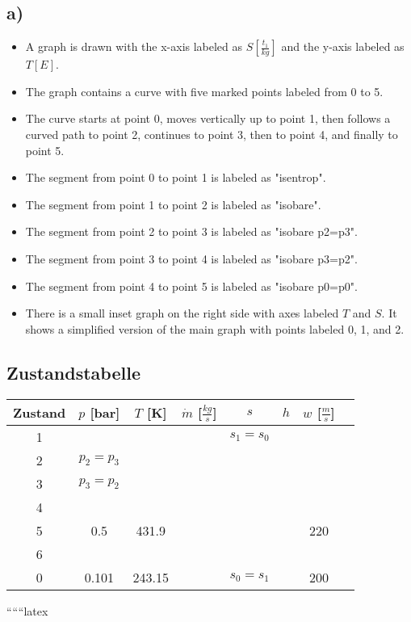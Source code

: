 

\subsection*{a)}

\begin{itemize}
    \item A graph is drawn with the x-axis labeled as $S \left[\frac{t_1}{kg}\right]$ and the y-axis labeled as $T \left[E\right]$.
    \item The graph contains a curve with five marked points labeled from 0 to 5.
    \item The curve starts at point 0, moves vertically up to point 1, then follows a curved path to point 2, continues to point 3, then to point 4, and finally to point 5.
    \item The segment from point 0 to point 1 is labeled as "isentrop".
    \item The segment from point 1 to point 2 is labeled as "isobare".
    \item The segment from point 2 to point 3 is labeled as "isobare p2=p3".
    \item The segment from point 3 to point 4 is labeled as "isobare p3=p2".
    \item The segment from point 4 to point 5 is labeled as "isobare p0=p0".
    \item There is a small inset graph on the right side with axes labeled $T$ and $S$. It shows a simplified version of the main graph with points labeled 0, 1, and 2.
\end{itemize}

\subsection*{Zustandstabelle}

\begin{tabular}{|c|c|c|c|c|c|c|c|}
    \hline
    Zustand & $p$ [bar] & $T$ [K] & $\dot{m}$ [\(\frac{kg}{s}\)] & $s$ & $h$ & $w$ [\(\frac{m}{s}\)] \\
    \hline
    1 & & & & $s_1=s_0$ & & \\
    \hline
    2 & $p_2=p_3$ & & & & & \\
    \hline
    3 & $p_3=p_2$ & & & & & \\
    \hline
    4 & & & & & & \\
    \hline
    5 & 0.5 & 431.9 & & & & 220 \\
    \hline
    6 & & & & & & \\
    \hline
    0 & 0.101 & 243.15 & & $s_0=s_1$ & & 200 \\
    \hline
\end{tabular}

``````latex